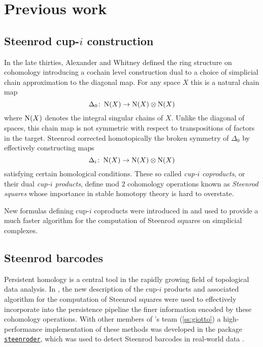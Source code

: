 \section{Previous work} \label{s:past}

\subsection{Steenrod cup-$i$ construction} \label{ss:cup-i}

In the late thirties, Alexander and Whitney defined the ring structure on cohomology introducing a cochain level construction dual to a choice of simplicial chain approximation to the diagonal map.
For any space $X$ this is a natural chain map
\[
\Delta_0 \colon \operatorname{N}(X) \to \operatorname{N}(X) \otimes \operatorname{N}(X)
\]
where $\operatorname{N}(X)$ denotes the integral singular chains of $X$.
Unlike the diagonal of spaces, this chain map is not symmetric with respect to transpositions of factors in the target.
Steenrod \cite{steenrod1947products} corrected homotopically the broken symmetry of $\Delta_0$ by effectively constructing maps
\begin{equation*}
\Delta_i \colon \operatorname{N}(X) \to \operatorname{N}(X) \otimes \operatorname{N}(X)
\end{equation*}
satisfying certain homological conditions.
These so called \textit{cup-$i$ coproducts}, or their dual \textit{cup-$i$ products}, define mod $2$ cohomology operations known as \textit{Steenrod squares} whose importance in stable homotopy theory is hard to overstate.

New formulas defining cup-$i$ coproducts were introduced in \cite{medina2023fast_sq} and used to provide a much faster algorithm for the computation of Steenrod squares on simplicial complexes.

\subsection{Steenrod barcodes} \label{ss:steenroder}

Persistent homology is a central tool in the rapidly growing field of topological data analysis.
In \cite{medina2022per_st}, the new description of the cup-$i$ products and associated algorithm for the computation of Steenrod squares were used to effectively incorporate into the persistence pipeline the finer information encoded by these cohomology operations.
With other members of \giottoTDA's team (\cref{ss:giotto}) a high-performance implementation of these methods was developed in the package \href{https://steenroder.github.io/steenroder/}{\texttt{steenroder}}, which was used to detect Steenrod barcodes in real-world data \cite{medina2022per_st}.

